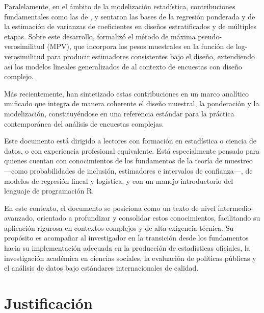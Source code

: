 \documentclass[
  spanish,
  12pt,
]{book}
\begin{document}
Paralelamente, en el ámbito de la modelización estadística, contribuciones fundamentales como las de \citet{kish1974inference}, \citet{fuller1975regression} y \citet{binder1983variances} sentaron las bases de la regresión ponderada y de la estimación de varianzas de coeficientes en diseños estratificados y de múltiples etapas. Sobre este desarrollo, \citet{pfeffermann1993role} formalizó el método de máxima pseudo-verosimilitud (MPV), que incorpora los pesos muestrales en la función de log-verosimilitud para producir estimadores consistentes bajo el diseño, extendiendo así los modelos lineales generalizados de \citet{nelder1972generalized} al contexto de encuestas con diseño complejo.

Más recientemente, \citet{heeringa2017applied} han sintetizado estas contribuciones en un marco analítico unificado que integra de manera coherente el diseño muestral, la ponderación y la modelización, constituyéndose en una referencia estándar para la práctica contemporánea del análisis de encuestas complejas.

Este documento está dirigido a lectores con formación en estadística o ciencia de datos, o con experiencia profesional equivalente. Está especialmente pensado para quienes cuentan con conocimientos de los fundamentos de la teoría de muestreo ---como probabilidades de inclusión, estimadores e intervalos de confianza---, de modelos de regresión lineal y logística, y con un manejo introductorio del lenguaje de programación R.

En este contexto, el documento se posiciona como un texto de nivel intermedio-avanzado, orientado a profundizar y consolidar estos conocimientos, facilitando su aplicación rigurosa en contextos complejos y de alta exigencia técnica. Su propósito es acompañar al investigador en la transición desde los fundamentos hacia su implementación adecuada en la producción de estadísticas oficiales, la investigación académica en ciencias sociales, la evaluación de políticas públicas y el análisis de datos bajo estándares internacionales de calidad.

\section{Justificación}\label{justificacion}
\end{document}
